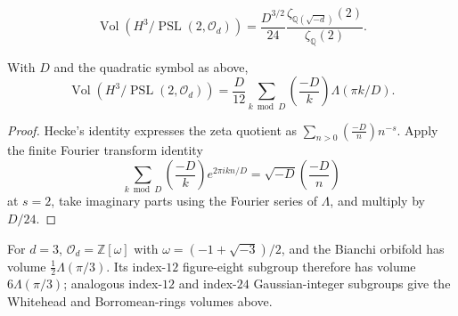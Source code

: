 \begin{theorem}
\label{thurston-ch07-bianchi-covolume}

\[
\operatorname{Vol}(H^3/\operatorname{PSL}(2,\mathcal O_d))
=\frac{D^{3/2}}{24}\frac{\zeta_{\mathbb Q(\sqrt{-d})}(2)}{\zeta_{\mathbb Q}(2)}.
\]
\end{theorem}

\begin{theorem}
\label{thurston-ch07-arithmetic-lobachevsky-volume}

With $D$ and the quadratic symbol as above,
\[
\operatorname{Vol}(H^3/\operatorname{PSL}(2,\mathcal O_d))
=\frac D{12}\sum_{k\bmod D}\left(\frac{-D}{k}\right)\Lambda(\pi k/D).
\]
\end{theorem}
\begin{proof}
\sketch
Hecke's identity expresses the zeta quotient as $\sum_{n>0}(\frac{-D}{n})n^{-s}$.  Apply the finite Fourier transform identity
\[
\sum_{k\bmod D}\left(\frac{-D}{k}\right)e^{2\pi ikn/D}=\sqrt{-D}\left(\frac{-D}{n}\right)
\]
at $s=2$, take imaginary parts using the Fourier series of $\Lambda$, and multiply by $D/24$.
\end{proof}

\begin{example}
\label{thurston-ch07-arithmetic-link-volumes}

For $d=3$, $\mathcal O_d=\mathbb Z[\omega]$ with $\omega=(-1+\sqrt{-3})/2$, and the Bianchi orbifold has volume $\frac12\Lambda(\pi/3)$.  Its index-$12$ figure-eight subgroup therefore has volume $6\Lambda(\pi/3)$; analogous index-$12$ and index-$24$ Gaussian-integer subgroups give the Whitehead and Borromean-rings volumes above.
\end{example}
